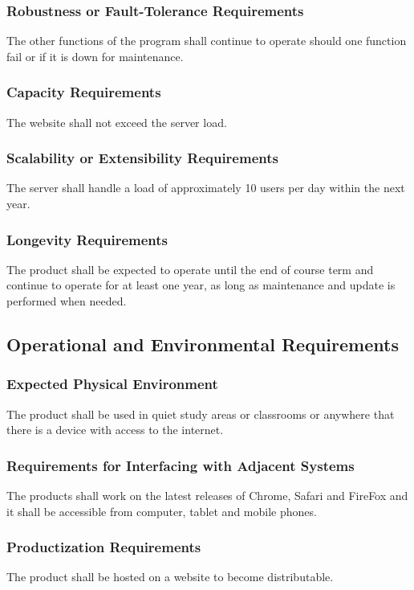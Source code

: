 \documentclass[11pt, oneside]{article}
\begin{document}
\subsubsection{Robustness or Fault-Tolerance Requirements}
The other functions of the program shall continue to operate should one function fail or if it is down for maintenance.


\subsubsection{Capacity Requirements}
The website shall not exceed the server load.


\subsubsection{Scalability or Extensibility Requirements}
The server shall handle a load of approximately 10 users per day within the next year.  


\subsubsection{Longevity Requirements}
The product shall be expected to operate until the end of course term and continue to operate for at least one year, as long as maintenance and update is performed when needed.


\subsection{Operational and Environmental Requirements}
\subsubsection{Expected Physical Environment}
The product shall be used in quiet study areas or classrooms or anywhere that there is a device with access to the internet.


\subsubsection{Requirements for Interfacing with Adjacent Systems}
The products shall work on the latest releases of Chrome, Safari and FireFox and it shall be accessible from computer, tablet and mobile phones.


\subsubsection{Productization Requirements}
The product shall be hosted on a website to become distributable.
\end{document}
